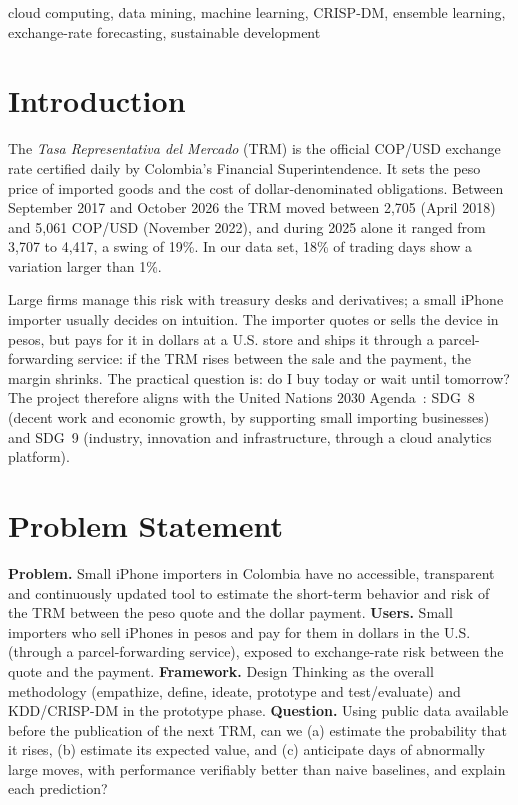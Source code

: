 \documentclass[conference]{IEEEtran}
\begin{document}
\begin{IEEEkeywords}
cloud computing, data mining, machine learning, CRISP-DM, ensemble learning, exchange-rate forecasting, sustainable development
\end{IEEEkeywords}

\section{Introduction}
The \emph{Tasa Representativa del Mercado} (TRM) is the official COP/USD exchange rate certified daily by Colombia's Financial Superintendence. It sets the peso price of imported goods and the cost of dollar-denominated obligations. Between September 2017 and October 2026 the TRM moved between 2{,}705 (April 2018) and 5{,}061 COP/USD (November 2022), and during 2025 alone it ranged from 3{,}707 to 4{,}417, a swing of 19\%. In our data set, 18\% of trading days show a variation larger than 1\%.

Large firms manage this risk with treasury desks and derivatives; a small iPhone importer usually decides on intuition. The importer quotes or sells the device in pesos, but pays for it in dollars at a U.S. store and ships it through a parcel-forwarding service: if the TRM rises between the sale and the payment, the margin shrinks. The practical question is: do I buy today or wait until tomorrow? The project therefore aligns with the United Nations 2030 Agenda~\cite{un2015}: SDG~8 (decent work and economic growth, by supporting small importing businesses) and SDG~9 (industry, innovation and infrastructure, through a cloud analytics platform).

\section{Problem Statement}
\textbf{Problem.} Small iPhone importers in Colombia have no accessible, transparent and continuously updated tool to estimate the short-term behavior and risk of the TRM between the peso quote and the dollar payment. \textbf{Users.} Small importers who sell iPhones in pesos and pay for them in dollars in the U.S. (through a parcel-forwarding service), exposed to exchange-rate risk between the quote and the payment. \textbf{Framework.} Design Thinking as the overall methodology (empathize, define, ideate, prototype and test/evaluate) and KDD/CRISP-DM in the prototype phase. \textbf{Question.} Using public data available before the publication of the next TRM, can we (a) estimate the probability that it rises, (b) estimate its expected value, and (c) anticipate days of abnormally large moves, with performance verifiably better than naive baselines, and explain each prediction?
\end{document}
